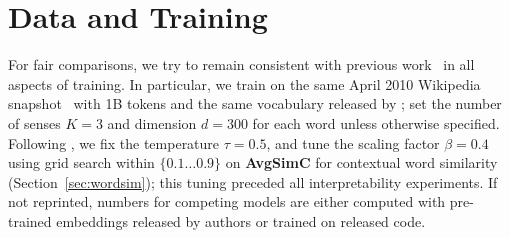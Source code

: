 \section{Data and Training}
\label{sec:setup}


For fair comparisons, we try to remain consistent with previous
work~\citep{huang2012improving,neelakantan2015efficient,Muse} in all
aspects of training. In particular, we train \gasi{} on the same April
2010 Wikipedia snapshot~\citep{wiki} with 1B tokens and the same
vocabulary released by ; set the
number of senses $K=3$ and dimension $d=300$ for each word unless
otherwise specified.  Following , we fix the
temperature $\tau = 0.5$, and tune the scaling factor $\beta=0.4$
using grid search within $\{0.1\dots 0.9\}$ on \textbf{AvgSimC} for
contextual word similarity (Section~\ref{sec:wordsim}); this tuning
preceded all interpretability experiments. If not reprinted, numbers
for competing models are either computed with pre-trained embeddings
released by authors or trained on released code.